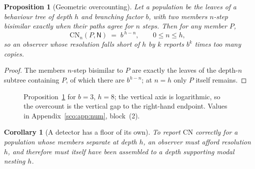 \documentclass[11pt]{article}
\theoremstyle{plain}
\newtheorem{proposition}[theorem]{Proposition}
\newtheorem{corollary}[theorem]{Corollary}
\theoremstyle{definition}
\theoremstyle{remark}
\newcommand{\Nsp}{\mathsf{N}}
\newcommand{\CN}{\mathrm{CN}}
\begin{document}
\begin{proposition}[Geometric overcounting]\label{sco:prop:geom}
Let a population be the leaves of a behaviour tree of depth $h$ and
branching factor $b$, with two members $n$-step bisimilar exactly when
their paths agree for $n$ steps. Then for any member $P$,
\[
  \CN_n(P,\Nsp) \;=\; b^{\,h-n}, \qquad 0 \le n \le h,
\]
so an observer whose resolution falls short of $h$ by $k$ reports
$b^{k}$ times too many copies.
\end{proposition}

\begin{proof}
The members $n$-step bisimilar to $P$ are exactly the leaves of the
depth-$n$ subtree containing $P$, of which there are $b^{h-n}$; at $n=h$
only $P$ itself remains.
\end{proof}

\begin{figure}[t]
\centering
{}
\caption{Proposition~\ref{sco:prop:geom} for $b=3$, $h=8$; the vertical
axis is logarithmic, so the overcount is the vertical gap to the
right-hand endpoint. Values in Appendix~\ref{sco:app:num}, block~(2).}
\label{sco:fig:overcount}
\end{figure}

\begin{corollary}[A detector has a floor of its own]\label{sco:cor:detector}
To report $\CN$ correctly for a population whose members separate at depth
$h$, an observer must afford resolution $h$, and therefore must itself have
been assembled to a depth supporting modal nesting $h$.
\end{corollary}
\end{document}
